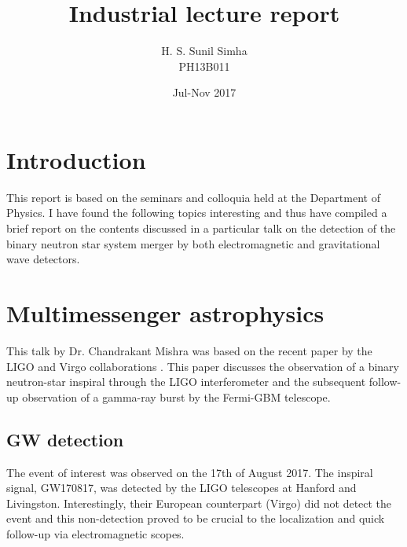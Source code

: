 \documentclass[a4paper,12pt,onecolumn,twoside]{article}
\begin{document}
	\title{Industrial lecture report}
	\author{H. S. Sunil Simha \\\small PH13B011}
	\date{Jul-Nov 2017}
    \maketitle
\section{Introduction}
This report is based on the seminars and colloquia held at the Department of Physics. I have found the following topics interesting and thus have compiled a brief report on the contents discussed in a particular talk on the detection of the binary neutron star system merger by both electromagnetic and gravitational wave detectors.
\section{Multimessenger astrophysics}
This talk by Dr. Chandrakant Mishra was based on the recent paper by the LIGO and Virgo collaborations \cite{Abbot2017}. This paper discusses the observation of a binary neutron-star inspiral through the LIGO interferometer and the subsequent follow-up observation of a gamma-ray burst by the Fermi-GBM telescope.
	\subsection{GW detection}
		The event of interest was observed on the 17th of August 2017. The inspiral signal, GW170817, was detected by the LIGO telescopes at Hanford and Livingston. Interestingly, their European counterpart (Virgo) did not detect the event and this non-detection proved to be crucial to the localization and quick follow-up via electromagnetic scopes.
\end{document}
